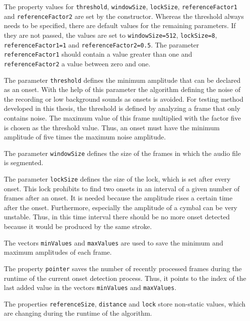 \begin{sloppypar}
The property values for \lstinline{threshold}, \lstinline{windowSize},  \lstinline{lockSize}, \lstinline{referenceFactor1} and \lstinline{referenceFactor2} are set by the constructor. Whereas the threshold always needs to be specified, there are default values for the remaining parameters. If they are not passed, the values are set to \lstinline{windowSize=512}, \lstinline{lockSize=8}, \lstinline{referenceFactor1=1} and \lstinline{referenceFactor2=0.5}. The parameter \lstinline{referenceFactor1} should contain a value greater than one and \lstinline{referenceFactor2} a value between zero and one.
\end{sloppypar}

The parameter \lstinline{threshold} defines the minimum amplitude that can be declared as an onset. With the help of this parameter the algorithm defining the noise of the recording or low background sounds as onsets is avoided. For testing method developed in this thesis, the threshold is defined by analyzing a frame that only contains noise. The maximum value of this frame multiplied with the factor five is chosen as the threshold value. Thus, an onset must have the minimum amplitude of five times the maximum noise amplitude.

The parameter \lstinline{windowSize} defines the size of the frames in which the audio file is segmented. 

The parameter \lstinline{lockSize} defines the size of the lock, which is set after every onset. This lock prohibits to find two onsets in an interval of a given number of frames after an onset. It is needed because the amplitude rises a certain time after the onset. Furthermore, especially the amplitude of a cymbal can be very unstable. Thus, in this time interval there should be no more onset detected because it would be produced by the same stroke. 

The vectors \lstinline{minValues} and \lstinline{maxValues} are used to save the minimum and maximum amplitudes of each frame. 

The property \lstinline{pointer} saves the number of recently processed frames during the runtime of the current onset detection process. Thus, it points to the index of the last added value in the vectors \lstinline{minValues} and \lstinline{maxValues}.

The properties \lstinline{referenceSize}, \lstinline{distance} and \lstinline{lock} store non-static values, which are changing during the runtime of the algorithm. 

